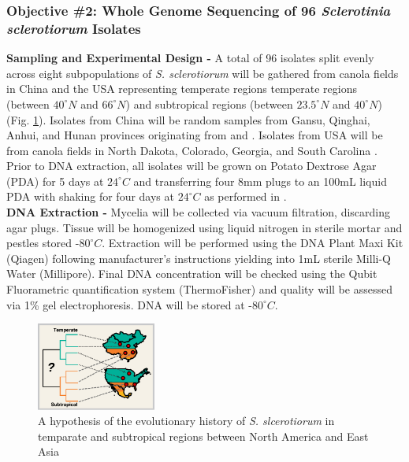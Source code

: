 \documentclass[12pt,letterpaper]{article}
\begin{document}
\subsubsection*{Objective \#2: Whole Genome Sequencing of 96 \textit{Sclerotinia sclerotiorum} Isolates}

\noindent \textbf{Sampling and Experimental Design -}
A total of 96 isolates split evenly across eight subpopulations of \textit{S. sclerotiorum} will be gathered from canola fields in China and the USA representing temperate regions temperate regions (between $40^{\circ}N$ and $66^{\circ}N$) and subtropical regions (between $23.5^{\circ}N$ and $40^{\circ}N$) (Fig. \ref{fig:us-china}).
Isolates from China will be random samples from Gansu, Qinghai, Anhui, and Hunan provinces originating from \citet{zhou2014dimethachlon} and \citet{attanayake2013sclerotinia}.
Isolates from USA will be from canola fields in North Dakota, Colorado, Georgia, and South Carolina \citep{aldrich-wolfe2015genetic,phillips2002phylogeography}.
Prior to DNA extraction, all isolates will be grown on Potato Dextrose Agar (PDA) for 5 days at $24^{\circ}C$ and transferring four 8mm plugs to an 100mL liquid PDA with shaking for four days at $24^{\circ}C$ as performed in \citet{derbyshire2017complete}.\\
\noindent \textbf{DNA Extraction -}
Mycelia will be collected via vacuum filtration, discarding agar plugs. Tissue will be homogenized using liquid nitrogen in sterile mortar and pestles stored -$80^{\circ}C$. Extraction will be performed using the DNA Plant Maxi Kit (Qiagen) following manufacturer's instructions yielding into 1mL sterile Milli-Q Water (Millipore). Final DNA concentration will be checked using the Qubit Fluorametric quantification system (ThermoFisher) and quality will be assessed via 1\% gel electrophoresis. DNA will be stored at -$80^{\circ}C$.\\
\begin{figure} %
  \includegraphics[width=0.35\textwidth]{figure/us-china.pdf}
  \caption{A hypothesis of the evolutionary history of \textit{S. slcerotiorum} in temparate and subtropical regions between North America and East Asia}
  \label{fig:us-china}
\end{figure} 
\end{document}

